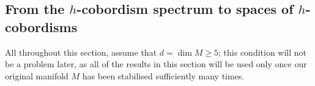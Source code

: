 \documentclass[a4paper, oneside]{amsart}
\newcommand{\1}{\mathds{1}}
\theoremstyle{remark}
\theoremstyle{definition}
\numberwithin{equation}{section}
\begin{document}

















\subsection{From the $h$-cobordism spectrum to spaces of $h$-cobordisms}\label{hcobsection} All throughout this section, assume that $d=\dim M\geq 5$; this condition will not be a problem later, as all of the results in this section will be used only once our original manifold $M$ has been stabilised sufficiently many times.
\end{document}
